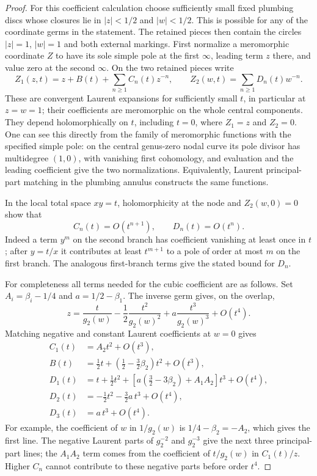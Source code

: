 \begin{proof}
For this coefficient calculation choose sufficiently small fixed
plumbing discs whose closures lie in $|z|<1/2$ and $|w|<1/2$.
This is possible for any of the coordinate germs in the statement.
The retained pieces then contain the circles $|z|=1$, $|w|=1$
and both external markings. First normalize a meromorphic
coordinate $Z$ to have its sole simple
pole at the first $\infty$, leading term $z$ there, and value zero
at the second $\infty$. On the two retained pieces write
\[
 Z_1(z,t)=z+B(t)+\sum_{n\geq1}C_n(t)z^{-n},\qquad
 Z_2(w,t)=\sum_{n\geq1}D_n(t)w^{-n}.
\]
These are convergent Laurent expansions for sufficiently small
$t$, in particular at $z=w=1$; their coefficients are meromorphic
on the whole central components. They depend holomorphically
on $t$, including $t=0$, where
$Z_1=z$ and $Z_2=0$. One can see this directly from the family of
meromorphic functions with the specified simple pole: on the
central genus-zero nodal curve its pole divisor has multidegree
$(1,0)$, with vanishing first cohomology, and evaluation and the
leading coefficient give the two normalizations. Equivalently,
Laurent principal-part matching in the plumbing annulus constructs
the same functions.

In the local total space $xy=t$, holomorphicity at the node and
$Z_2(w,0)=0$ show that
\[
 C_n(t)=O(t^{n+1}),\qquad D_n(t)=O(t^n).
\]
Indeed a term $y^m$ on the second branch has coefficient vanishing
at least once in $t$; after $y=t/x$ it contributes at least
$t^{m+1}$ to a pole of order at most $m$ on the first branch.
The analogous first-branch terms give the stated bound for $D_n$.

For completeness all terms needed for the cubic coefficient are
as follows. Set $A_i=\beta_i-1/4$ and $a=1/2-\beta_1$.
The inverse germ gives, on the overlap,
\[
 z=\frac t{g_2(w)}-\frac12\frac{t^2}{g_2(w)^2}
                          +a\frac{t^3}{g_2(w)^3}+O(t^4).
\]
Matching negative and constant Laurent coefficients at $w=0$
gives
\begin{align*}
 C_1(t)&=A_2t^2+O(t^3),\\
 B(t)&=\tfrac12t+(\tfrac12-\tfrac32\beta_2)t^2+O(t^3),\\
 D_1(t)&=t+\tfrac12t^2+
       \left[a(\tfrac32-3\beta_2)+A_1A_2\right]t^3+O(t^4),\\
 D_2(t)&=-\tfrac12t^2-\tfrac32a\,t^3+O(t^4),\\
 D_3(t)&=a\,t^3+O(t^4).
\end{align*}
For example, the coefficient of $w$ in $1/g_2(w)$ is
$1/4-\beta_2=-A_2$, which gives the first line. The negative
Laurent parts of $g_2^{-2}$ and $g_2^{-3}$ give the next three
principal-part lines; the $A_1A_2$ term comes from the coefficient
of $t/g_2(w)$ in $C_1(t)/z$. Higher $C_n$ cannot contribute to
these negative parts before order $t^4$.


\end{proof}
